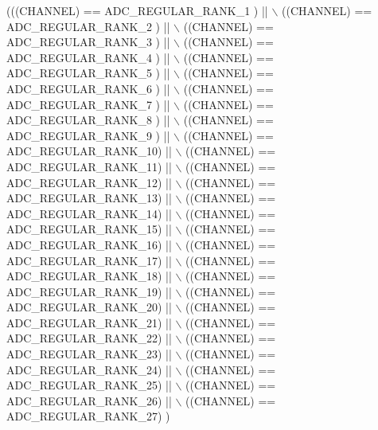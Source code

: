 \begin{DoxyCode}
(((CHANNEL) == ADC\_REGULAR\_RANK\_1 ) || \(\backslash\)
                                      ((CHANNEL) == ADC\_REGULAR\_RANK\_2 ) || \(\backslash\)
                                      ((CHANNEL) == ADC\_REGULAR\_RANK\_3 ) || \(\backslash\)
                                      ((CHANNEL) == ADC\_REGULAR\_RANK\_4 ) || \(\backslash\)
                                      ((CHANNEL) == ADC\_REGULAR\_RANK\_5 ) || \(\backslash\)
                                      ((CHANNEL) == ADC\_REGULAR\_RANK\_6 ) || \(\backslash\)
                                      ((CHANNEL) == ADC\_REGULAR\_RANK\_7 ) || \(\backslash\)
                                      ((CHANNEL) == ADC\_REGULAR\_RANK\_8 ) || \(\backslash\)
                                      ((CHANNEL) == ADC\_REGULAR\_RANK\_9 ) || \(\backslash\)
                                      ((CHANNEL) == ADC\_REGULAR\_RANK\_10) || \(\backslash\)
                                      ((CHANNEL) == ADC\_REGULAR\_RANK\_11) || \(\backslash\)
                                      ((CHANNEL) == ADC\_REGULAR\_RANK\_12) || \(\backslash\)
                                      ((CHANNEL) == ADC\_REGULAR\_RANK\_13) || \(\backslash\)
                                      ((CHANNEL) == ADC\_REGULAR\_RANK\_14) || \(\backslash\)
                                      ((CHANNEL) == ADC\_REGULAR\_RANK\_15) || \(\backslash\)
                                      ((CHANNEL) == ADC\_REGULAR\_RANK\_16) || \(\backslash\)
                                      ((CHANNEL) == ADC\_REGULAR\_RANK\_17) || \(\backslash\)
                                      ((CHANNEL) == ADC\_REGULAR\_RANK\_18) || \(\backslash\)
                                      ((CHANNEL) == ADC\_REGULAR\_RANK\_19) || \(\backslash\)
                                      ((CHANNEL) == ADC\_REGULAR\_RANK\_20) || \(\backslash\)
                                      ((CHANNEL) == ADC\_REGULAR\_RANK\_21) || \(\backslash\)
                                      ((CHANNEL) == ADC\_REGULAR\_RANK\_22) || \(\backslash\)
                                      ((CHANNEL) == ADC\_REGULAR\_RANK\_23) || \(\backslash\)
                                      ((CHANNEL) == ADC\_REGULAR\_RANK\_24) || \(\backslash\)
                                      ((CHANNEL) == ADC\_REGULAR\_RANK\_25) || \(\backslash\)
                                      ((CHANNEL) == ADC\_REGULAR\_RANK\_26) || \(\backslash\)
                                      ((CHANNEL) == ADC\_REGULAR\_RANK\_27)   )
\end{DoxyCode}
